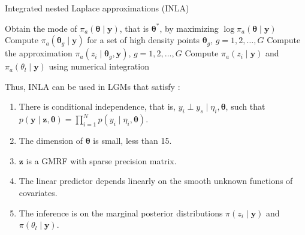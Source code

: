 \begin{algorithm}
	\caption{Integrated nested Laplace approximations (INLA)}\label{INLA0}
	\begin{algorithmic}[1]
		\State Obtain the mode of $\pi_a(\boldsymbol{\theta}\mid \boldsymbol{y})$, that is $\boldsymbol{\theta}^*$, by maximizing $\log \pi_a(\boldsymbol{\theta}\mid \boldsymbol{y})$
		\State Compute $\pi_a(\boldsymbol{\theta}_g\mid \boldsymbol{y})$ for a set of high density points $\boldsymbol{\theta}_g$, $g=1,2,\dots,G$
		\State Compute the approximation $\pi_a(z_i\mid \boldsymbol{\theta}_g,\boldsymbol{y})$, $g=1,2,\dots,G$
		\State Compute $\pi_a(z_i\mid \boldsymbol{y})$ and $\pi_a(\theta_l\mid\boldsymbol{y})$ using numerical integration
		   
	\end{algorithmic}
\end{algorithm}

Thus, INLA can be used in LGMs that satisfy \cite{rue2017bayesian,martino2019integrated}:
\begin{enumerate}
	\item There is conditional independence, that is, $y_i\perp y_s \mid \eta_i,\boldsymbol{\theta}$, such that $p(\boldsymbol{y}\mid \boldsymbol{z},\boldsymbol{\theta})=\prod_{i=1}^{N}p(y_i\mid \eta_i,\boldsymbol{\theta})$.
	\item The dimension of $\boldsymbol{\theta}$ is small, less than 15.
	\item $\boldsymbol{z}$ is a GMRF with sparse precision matrix.
	\item The linear predictor depends linearly on the smooth unknown functions of covariates.
	\item The inference is on the marginal posterior distributions $\pi(z_i\mid \boldsymbol{y})$ and $\pi(\theta_l\mid \boldsymbol{y})$.  
\end{enumerate} 


